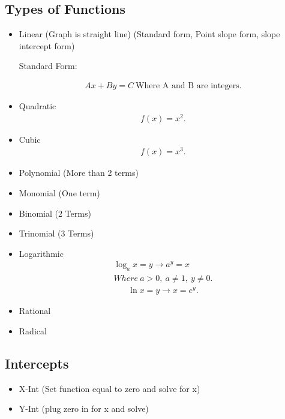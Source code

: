 \documentclass{report}
\begin{document}
    
    \pagebreak \bigbreak \noindent
    \subsection{Types of Functions}
    \begin{itemize}
        \item Linear (Graph is straight line) (Standard form, Point slope form, slope intercept form)
            \begin{center}
                Standard Form:
            \end{center}
            \begin{align*}
                Ax + By = C\ \text{Where A and B are integers}
            .\end{align*}
        \item Quadratic
            \begin{align*}
                f(x) = x^{2}
            .\end{align*}
        \item Cubic
            \begin{align*}
                f(x) = x^{3}
            .\end{align*}
        \item Polynomial (More than 2 terms)
        \item Monomial (One term)
        \item Binomial (2 Terms)
        \item Trinomial (3 Terms)
        \item Logarithmic
            \begin{align*}
                \log_a{x} = y \longrightarrow a^{y} =x \\
                Where\ a > 0,\ a \neq 1,\ y \neq 0
            .\end{align*}
            \begin{align*}
                \ln{x} = y \longrightarrow x =e^{y}
            .\end{align*}

        \item Rational 
        \item Radical
    \end{itemize}

    \bigbreak \noindent \bigbreak \noindent
    \subsection{Intercepts}
    \begin{itemize}
      \item X-Int (Set function equal to zero and solve for x)
      \item Y-Int (plug zero in for x and solve)
    \end{itemize}
\end{document}
